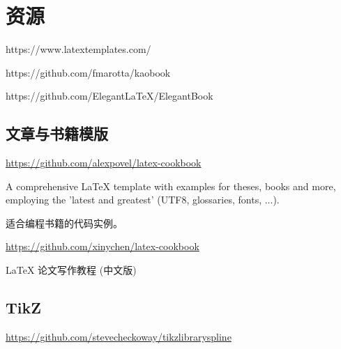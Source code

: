 \chapter{资源}

https://www.latextemplates.com/

https://github.com/fmarotta/kaobook

https://github.com/ElegantLaTeX/ElegantBook

\section{文章与书籍模版}

\url{https://github.com/alexpovel/latex-cookbook}

A comprehensive LaTeX template with examples for theses, books and more, employing the 'latest and greatest' (UTF8, glossaries, fonts, ...). 

适合编程书籍的代码实例。

\url{https://github.com/xinychen/latex-cookbook}

{\LaTeX} 论文写作教程 (中文版)

\section{TikZ}

\url{https://github.com/stevecheckoway/tikzlibraryspline}